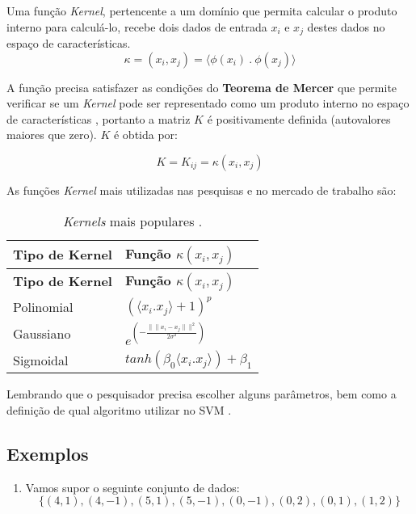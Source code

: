 \documentclass[
  openany]{book}
\providecommand{\tightlist}{%
  \setlength{\itemsep}{0pt}\setlength{\parskip}{0pt}}
\begin{document}
Uma função \emph{Kernel}, pertencente a um domínio que permita calcular o produto interno para calculá-lo, recebe dois dados de entrada \(x_i\) e \(x_j\) destes dados no espaço de características.
\begin{equation}
\kappa=(x_i,x_j)=\langle \phi(x_i) \ . \ \phi(x_j)\rangle
\label{eq:kernel}
\end{equation}

A função precisa satisfazer as condições do \textbf{Teorema de Mercer} que permite verificar se um \emph{Kernel} pode ser representado como um produto interno no espaço de características \citep{mercer1909xvi}, portanto a matriz \(K\) é positivamente definida (autovalores maiores que zero). \(K\) é obtida por:

\begin{equation}
K=K_{ij}=\kappa(x_i,x_j)
\label{eq:mercer}
\end{equation}

As funções \emph{Kernel} mais utilizadas nas pesquisas e no mercado de trabalho são:

\begin{longtable}[]{@{}ll@{}}
\caption{\label{tab:kernel} \emph{Kernels} mais populares \citep{gonccalves2015maquina}.}\tabularnewline
\toprule
\textbf{Tipo de Kernel} & \textbf{Função \(\kappa(x_i,x_j)\)}\tabularnewline
\midrule
\endfirsthead
\toprule
\textbf{Tipo de Kernel} & \textbf{Função \(\kappa(x_i,x_j)\)}\tabularnewline
\midrule
\endhead
Polinomial & \((\langle x_i.x_j\rangle +1)^p\)\tabularnewline
Gaussiano & \(e^{(-\frac{\|\|x_i-x_j\|\|^2}{2\sigma^2})}\)\tabularnewline
Sigmoidal & \(tanh(\beta_0 \langle x_i.x_j\rangle )+\beta_1\)\tabularnewline
\bottomrule
\end{longtable}

Lembrando que o pesquisador precisa escolher alguns parâmetros, bem como a definição de qual algoritmo utilizar no SVM \citep{lorena2003introduccaoas}.

\hypertarget{exemplosvm}{%
\subsection{Exemplos}\label{exemplosvm}}

\begin{enumerate}
\def\labelenumi{\arabic{enumi}.}
\tightlist
\item
  Vamos supor o seguinte conjunto de dados:
  \[\{ (4,1), (4,-1), (5,1), (5,-1), (0,-1), (0,2), (0,1), (1,2) \}\]
\end{enumerate}
\end{document}
